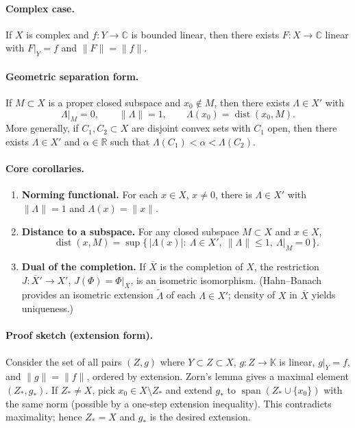 \documentclass[12pt,a4paper]{article}
\theoremstyle{plain}
\theoremstyle{definition}
\theoremstyle{remark}
\theoremstyle{remark}
\theoremstyle{definition}
\begin{document}
	\paragraph{Complex case.}
	If $X$ is complex and $f:Y\to\mathbb C$ is bounded linear, then there exists
	$F:X\to\mathbb C$ linear with $F|_Y=f$ and $\|F\|=\|f\|$.
	
	\paragraph{Geometric separation form.}
	If $M\subset X$ is a proper closed subspace and $x_0\notin M$, then there exists $\Lambda\in X'$ with
	\[
	\Lambda|_M=0,\qquad \|\Lambda\|=1,\qquad \Lambda(x_0)=\operatorname{dist}(x_0,M).
	\]
	More generally, if $C_1,C_2\subset X$ are disjoint convex sets with $C_1$ open, then
	there exists $\Lambda\in X'$ and $\alpha\in\mathbb R$ such that
	$\Lambda(C_1)<\alpha<\Lambda(C_2)$.
	
	\bigskip
	
	\paragraph{Core corollaries.}
	\begin{enumerate}
		\item \textbf{Norming functional.} For each $x\in X$, $x\neq0$, there is $\Lambda\in X'$ with
		$\|\Lambda\|=1$ and $\Lambda(x)=\|x\|$.
		\item \textbf{Distance to a subspace.}
		For any closed subspace $M\subset X$ and $x\in X$,
		\[
		\operatorname{dist}(x,M)
		=\sup\{\,|\Lambda(x)|:\ \Lambda\in X',\ \|\Lambda\|\le1,\ \Lambda|_M=0\,\}.
		\]
		\item \textbf{Dual of the completion.}
		If $\overline{X}$ is the completion of $X$, the restriction
		$J:\overline{X}'\to X'$, $J(\Phi)=\Phi|_X$, is an isometric isomorphism.
		(Hahn--Banach provides an isometric extension $\widetilde\Lambda$ of each $\Lambda\in X'$;
		density of $X$ in $\overline{X}$ yields uniqueness.)
	\end{enumerate}
	
	\paragraph{Proof sketch (extension form).}
	Consider the set of all pairs $(Z,g)$ where $Y\subset Z\subset X$, $g:Z\to\mathbb K$ is linear,
	$g|_Y=f$, and $\|g\|=\|f\|$, ordered by extension. Zorn's lemma gives a maximal element $(Z_*,g_*)$.
	If $Z_*\neq X$, pick $x_0\in X\setminus Z_*$ and extend $g_*$ to $\operatorname{span}(Z_*\cup\{x_0\})$
	with the same norm (possible by a one-step extension inequality). This contradicts maximality;
	hence $Z_*=X$ and $g_*$ is the desired extension.
	
\end{document}
